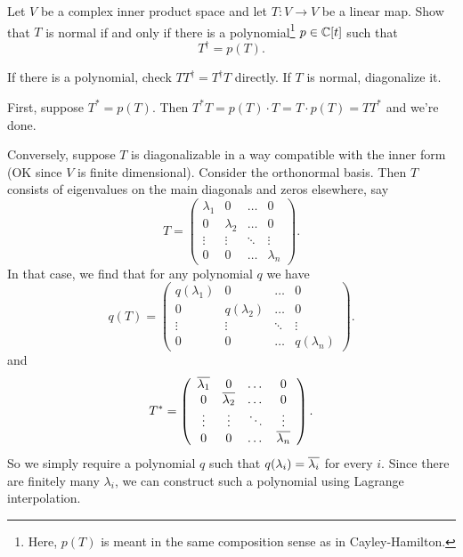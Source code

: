 \begin{problem}
	Let $V$ be a complex inner product space
	and let $T \colon V \to V$ be a linear map.
	Show that $T$ is normal if and only if
	there is a polynomial\footnote{Here,
		$p(T)$ is meant in the same composition
		sense as in Cayley-Hamilton.}
	$p \in \mathbb C[t]$ such that \[ T^\dagger = p(T). \]
	\begin{hint}
		If there is a polynomial, check $TT^\dagger = T^\dagger T$ directly.
		If $T$ is normal, diagonalize it.
	\end{hint}
	\begin{sol}
		First, suppose $T^\ast = p(T)$.
		Then $T^\ast T = p(T) \cdot T = T \cdot p(T) = T T^\ast$ and we're done.

		Conversely, suppose $T$ is diagonalizable
		in a way compatible with the inner form
		(OK since $V$ is finite dimensional).
		Consider the orthonormal basis.
		Then $T$ consists of eigenvalues on the main diagonals
		and zeros elsewhere, say
		\[ T = \left(
			\begin{array}{cccc}
				\lambda_1 & 0 & \dots & 0 \\
				0 & \lambda_2 & \dots & 0 \\
				\vdots & \vdots & \ddots &  \vdots \\
				0 & 0 & \dots & \lambda_n
			\end{array}
			\right). \]
		In that case, we find that for any polynomial $q$ we have
		\[ q(T) = \left(
			\begin{array}{cccc}
				q(\lambda_1) & 0 & \dots & 0 \\
				0 & q(\lambda_2) & \dots & 0 \\
				\vdots & \vdots & \ddots &  \vdots \\
				0 & 0 & \dots & q(\lambda_n)
			\end{array}
			\right). \]
		and
		\[ T^\ast = \left(
			\begin{array}{cccc}
				\overline{\lambda_1} & 0 & \dots & 0 \\
				0 & \overline{\lambda_2} & \dots & 0 \\
				\vdots & \vdots & \ddots &  \vdots \\
				0 & 0 & \dots & \overline{\lambda_n}
			\end{array}
			\right). \]
		So we simply require a polynomial $q$
		such that $q(\lambda_i) = \overline{\lambda_i}$ for every $i$.
		Since there are finitely many $\lambda_i$,
		we can construct such a polynomial using Lagrange interpolation.
	\end{sol}
\end{problem}
